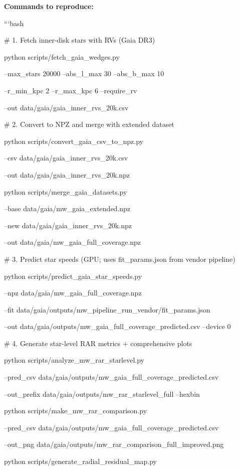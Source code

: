 \documentclass[11pt,a4paper]{article}
\begin{document}
\textbf{Commands to reproduce:}

```bash

\# 1. Fetch inner-disk stars with RVs (Gaia DR3)

python scripts/fetch\_gaia\_wedges.py \

  --max\_stars 20000 --abs\_l\_max 30 --abs\_b\_max 10 \

  --r\_min\_kpc 2 --r\_max\_kpc 6 --require\_rv \

  --out data/gaia/gaia\_inner\_rvs\_20k.csv


\# 2. Convert to NPZ and merge with extended dataset

python scripts/convert\_gaia\_csv\_to\_npz.py \

  --csv data/gaia/gaia\_inner\_rvs\_20k.csv \

  --out data/gaia/gaia\_inner\_rvs\_20k.npz


python scripts/merge\_gaia\_datasets.py \

  --base data/gaia/mw\_gaia\_extended.npz \

  --new data/gaia/gaia\_inner\_rvs\_20k.npz \

  --out data/gaia/mw\_gaia\_full\_coverage.npz


\# 3. Predict star speeds (GPU; uses fit\_params.json from vendor pipeline)

python scripts/predict\_gaia\_star\_speeds.py \

  --npz data/gaia/mw\_gaia\_full\_coverage.npz \

  --fit data/gaia/outputs/mw\_pipeline\_run\_vendor/fit\_params.json \

  --out data/gaia/outputs/mw\_gaia\_full\_coverage\_predicted.csv --device 0


\# 4. Generate star-level RAR metrics + comprehensive plots

python scripts/analyze\_mw\_rar\_starlevel.py \

  --pred\_csv data/gaia/outputs/mw\_gaia\_full\_coverage\_predicted.csv \

  --out\_prefix data/gaia/outputs/mw\_rar\_starlevel\_full --hexbin


python scripts/make\_mw\_rar\_comparison.py \

  --pred\_csv data/gaia/outputs/mw\_gaia\_full\_coverage\_predicted.csv \

  --out\_png data/gaia/outputs/mw\_rar\_comparison\_full\_improved.png


python scripts/generate\_radial\_residual\_map.py
\end{document}
